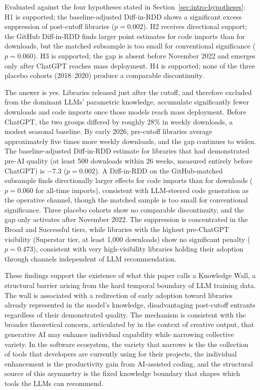 \documentclass[12pt, a4paper]{report}
\begin{document}
Evaluated against the four hypotheses stated in Section~\ref{sec:intro-hypotheses}: H1 is supported; the baseline-adjusted Diff-in-RDD shows a significant excess suppression of post-cutoff libraries ($p = 0.002$). H2 receives directional support; the GitHub Diff-in-RDD finds larger point estimates for code imports than for downloads, but the matched subsample is too small for conventional significance ($p = 0.060$). H3 is supported; the gap is absent before November 2022 and emerges only after ChatGPT reaches mass deployment. H4 is supported; none of the three placebo cohorts (2018--2020) produce a comparable discontinuity.

The answer is yes. Libraries released just after the cutoff, and therefore excluded from the dominant LLMs' parametric knowledge, accumulate significantly fewer downloads and code imports once those models reach mass deployment. Before ChatGPT, the two groups differed by roughly 28\% in weekly downloads, a modest seasonal baseline. By early 2026, pre-cutoff libraries average approximately five times more weekly downloads, and the gap continues to widen. The baseline-adjusted Diff-in-RDD estimate for libraries that had demonstrated pre-AI quality (at least 500 downloads within 26 weeks, measured entirely before ChatGPT) is $-7.3$ ($p = 0.002$). A Diff-in-RDD on the GitHub-matched subsample finds directionally larger effects for code imports than for downloads ($p = 0.060$ for all-time imports), consistent with LLM-steered code generation as the operative channel, though the matched sample is too small for conventional significance. Three placebo cohorts show no comparable discontinuity, and the gap only activates after November 2022. The suppression is concentrated in the Broad and Successful tiers, while libraries with the highest pre-ChatGPT visibility (Superstar tier, at least 1{,}000 downloads) show no significant penalty ($p = 0.473$), consistent with very high-visibility libraries holding their adoption through channels independent of LLM recommendation.

These findings support the existence of what this paper calls a Knowledge Wall, a structural barrier arising from the hard temporal boundary of LLM training data. The wall is associated with a redirection of early adoption toward libraries already represented in the model's knowledge, disadvantaging post-cutoff entrants regardless of their demonstrated quality. The mechanism is consistent with the broader theoretical concern, articulated by \citet{doshi2024generative} in the context of creative output, that generative AI may enhance individual capability while narrowing collective variety. In the software ecosystem, the variety that narrows is the the collection of tools that developers are currently using for their projects, the individual enhancement is the productivity gain from AI-assisted coding, and the structural source of this asymmetry is the fixed knowledge boundary that shapes which tools the LLMs can recommend.
\end{document}
